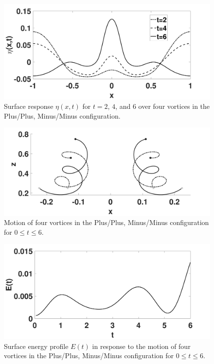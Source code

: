 \documentclass[a4paper,11pt]{article}
\begin{document}
\begin{figure}[!h]
\centering
\includegraphics[width=.75\textwidth]{surf_resp_mu_pt2_F_pt2_ppmm}
\caption{Surface response $\eta(x,t)$ for $t=2$, $4$, and $6$ over four vortices in the Plus/Plus, Minus/Minus configuration.}
\label{fig:surfrepppmm}
\end{figure}
\begin{figure}[!h]
\centering
\includegraphics[width=.75\textwidth]{tracks_F_pt2_tf_6_ppmm}
\caption{Motion of four vortices in the Plus/Plus, Minus/Minus configuration for $0\leq t \leq 6$.}
\label{fig:trackppmm}
\end{figure}
\begin{figure}[!h]
\centering
\includegraphics[width=.75\textwidth]{energy_profile_mu_pt2_F_pt2_ppmm}
\caption{Surface energy profile $E(t)$ in response to the motion of four vortices in the Plus/Plus, Minus/Minus configuration for $0\leq t \leq 6$.}
\label{fig:eprof_ppmm}
\end{figure}

\end{document}
